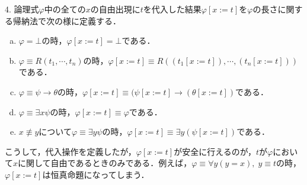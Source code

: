 \documentclass[uplatex, dvipdfmx]{jsreport}
\begin{document}
\begin{definition}
    4. 論理式$\varphi$中の全ての$x$の自由出現に$t$を代入した結果$\varphi[x:=t]$を$\varphi$の長さに関する帰納法で次の様に定義する．
    \begin{enumerate}[(a)]
        \item $\varphi=\bot$の時，$\varphi[x:=t]=\bot$である．
        \item $\varphi\equiv R(t_1,\cdots,t_n)$の時，$\varphi[x:=t]\equiv R((t_1[x:=t]),\cdots,(t_n[x:=t]))$である．
        \item $\varphi\equiv\psi\to\theta$の時，$\varphi[x:=t]\equiv (\psi[x:=t]\to(\theta[x:=t])$である．
        \item $\varphi\equiv\exists x\psi$の時，$\varphi[x:=t]\equiv\varphi$である．
        \item $x\not\equiv y$について$\varphi\equiv\exists y\psi$の時，$\varphi[x:=t]\equiv\exists y(\psi[x:=t])$である．
    \end{enumerate}
\end{definition}
\begin{remark}
    こうして，代入操作を定義したが，$\varphi[x:=t]$が安全に行えるのが，$t$が$\varphi$において$x$に関して自由であるときのみである．例えば，$\varphi\equiv\forall y(y=x),\;y\equiv t$の時，$\varphi[x:=t]$は恒真命題になってしまう．
\end{remark}
\end{document}
